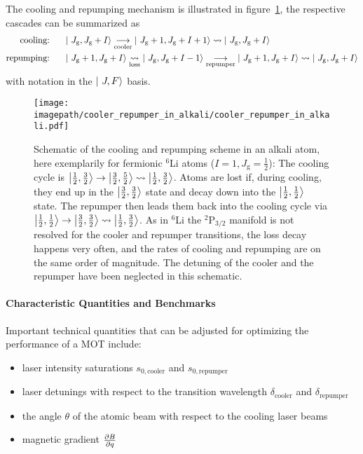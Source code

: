 The cooling and repumping mechanism is illustrated in figure~\ref{fig:cooler_repumper_in_alkali}, the respective cascades can be summarized as
\begin{align}
    \label{eq:cooler_cascade}\text{cooling:}~~~~~ & \Ket{~J_\text{g},J_\text{g} + I} \underset{\text{cooler}}{\longrightarrow} \Ket{~J_\text{g} + 1, J_\text{g} + I + 1} \rightsquigarrow  \Ket{~J_\text{g}, J_\text{g} + I}\\
    \label{eq:repumper_cascade}\text{repumping:}~~~~~ & \Ket{~J_\text{g} + 1, J_\text{g} + I} \underset{\text{loss}}{\rightsquigarrow} \Ket{~J_\text{g}, J_\text{g} + I - 1}  \underset{\text{repumper}}{\longrightarrow} \Ket{~J_\text{g} + 1, J_\text{g} + I} \rightsquigarrow  \Ket{~J_\text{g}, J_\text{g} + I}
\end{align}
with notation in the $\Ket{~J, F}$ basis.

\begin{figure}
    \centering
    \texttt{[image: \\imagepath/cooler\_repumper\_in\_alkali/cooler\_repumper\_in\_alkali.pdf]}
    \caption{Schematic of the cooling and repumping scheme in an alkali atom, here exemplarily for fermionic $^6$Li atoms ($I = 1, J_\text{g} = \frac{1}{2}$): The cooling cycle is $\Ket{\frac{1}{2}, \frac{3}{2}} \rightarrow \Ket{\frac{3}{2}, \frac{5}{2}} \rightsquigarrow \Ket{\frac{1}{2}, \frac{3}{2}}$. Atoms are lost if, during cooling, they end up in the $\Ket{\frac{3}{2}, \frac{3}{2}}$ state and decay down into the $\Ket{\frac{1}{2}, \frac{1}{2}}$ state. The repumper then leads them back into the cooling cycle via $\Ket{\frac{1}{2}, \frac{1}{2}} \rightarrow \Ket{\frac{3}{2}, \frac{3}{2}} \rightsquigarrow \Ket{\frac{1}{2}, \frac{3}{2}}$. As in $^6$Li the $^2\text{P}_{3/2}$ manifold is not resolved for the cooler and repumper transitions, the loss decay happens very often, and the rates of cooling and repumping are on the same order of magnitude. The detuning of the cooler and the repumper have been neglected in this schematic.}
    \label{fig:cooler_repumper_in_alkali}
\end{figure}

\paragraph{Characteristic Quantities and Benchmarks}
Important technical quantities that can be adjusted for optimizing the performance of a MOT include:
\begin{itemize}
    \item laser intensity saturations $s_{0, \text{cooler}}$ and $s_{0, \text{repumper}}$
    \item laser detunings with respect to the transition wavelength $\delta_\text{cooler}$ and $\delta_\text{repumper}$
    \item the angle $\theta$ of the atomic beam with respect to the cooling laser beams
    \item magnetic gradient $\pdv{B}{q}$
\end{itemize}

